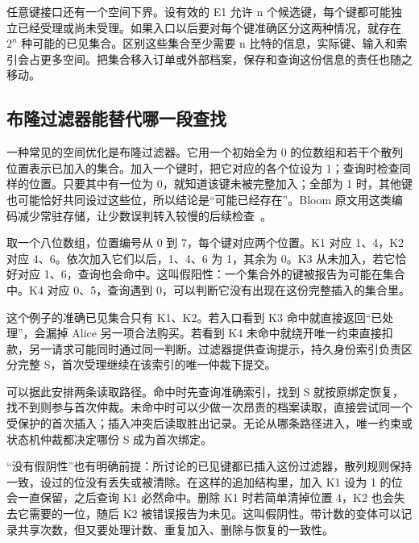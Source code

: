 
任意键接口还有一个空间下界。设有效的 E1 允许 n 个候选键，每个键都可能独立已经受理或尚未受理。如果入口以后要对每个键准确区分这两种情况，就存在 $2^n$ 种可能的已见集合。区别这些集合至少需要 n 比特的信息，实际键、输入和索引会占更多空间。把集合移入订单或外部档案，保存和查询这份信息的责任也随之移动。

\subsection*{布隆过滤器能替代哪一段查找}

一种常见的空间优化是布隆过滤器。它用一个初始全为 0 的位数组和若干个散列位置表示已加入的集合。加入一个键时，把它对应的各个位设为 1；查询时检查同样的位置。只要其中有一位为 0，就知道该键未被完整加入；全部为 1 时，其他键也可能恰好共同设过这些位，所以结论是“可能已经存在”。Bloom 原文用这类编码减少常驻存储，让少数误判转入较慢的后续检查~\cite{bloom1970}。

取一个八位数组，位置编号从 0 到 7，每个键对应两个位置。K1 对应 1、4，K2 对应 4、6。依次加入它们以后，1、4、6 为 1，其余为 0。K3 从未加入，若它恰好对应 1、6，查询也会命中。这叫假阳性：一个集合外的键被报告为可能在集合中。K4 对应 0、5，查询遇到 0，可以判断它没有出现在这份完整插入的集合里。


这个例子的准确已见集合只有 K1、K2。若入口看到 K3 命中就直接返回“已处理”，会漏掉 Alice 另一项合法购买。若看到 K4 未命中就绕开唯一约束直接扣款，另一请求可能同时通过同一判断。过滤器提供查询提示，持久身份索引负责区分完整 S，首次受理继续在该索引的唯一仲裁下提交。

可以据此安排两条读取路径。命中时先查询准确索引，找到 S 就按原绑定恢复，找不到则参与首次仲裁。未命中时可以少做一次昂贵的档案读取，直接尝试同一个受保护的首次插入；插入冲突后读取胜出记录。无论从哪条路径进入，唯一约束或状态机仲裁都决定哪份 S 成为首次绑定。


“没有假阴性”也有明确前提：所讨论的已见键都已插入这份过滤器，散列规则保持一致，设过的位没有丢失或被清除。在这样的追加结构里，加入 K1 设为 1 的位会一直保留，之后查询 K1 必然命中。删除 K1 时若简单清掉位置 4，K2 也会失去它需要的一位，随后 K2 被错误报告为未见。这叫假阴性。带计数的变体可以记录共享次数，但又要处理计数、重复加入、删除与恢复的一致性。

